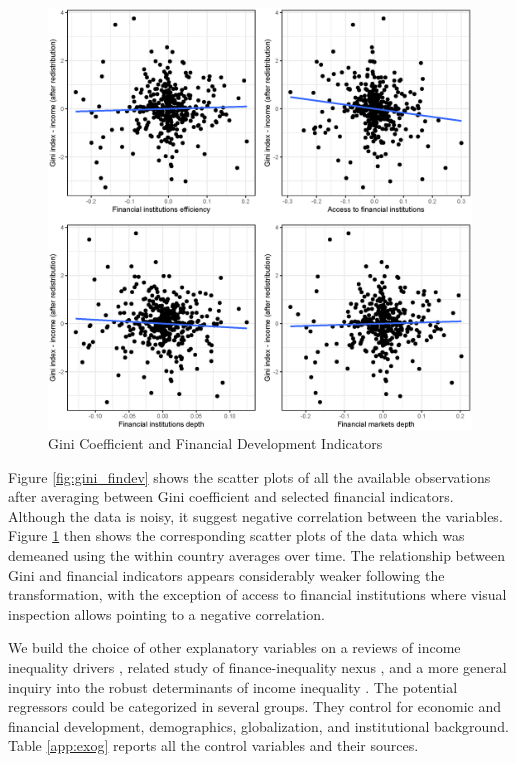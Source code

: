 \documentclass[a4paper,11pt]{article}
\begin{document}
\begin{figure}
    \caption{Gini Coefficient and Financial Development Indicators}
    \label{fig:gini_findev_dm}
    \includegraphics[width=\textwidth, keepaspectratio]{figures/plots_findev_gini_dm}
\end{figure}

Figure \ref{fig:gini_findev} shows the scatter plots of all the available observations after averaging between Gini coefficient and selected financial indicators. Although the data is noisy, it suggest negative correlation between the variables. Figure \ref{fig:gini_findev_dm} then shows the corresponding scatter plots of the data which was demeaned using the within country averages over time. The relationship between Gini and financial indicators appears considerably weaker following the transformation, with the exception of access to financial institutions where visual inspection allows pointing to a negative correlation.

 
We build the choice of other explanatory variables on a reviews of income inequality drivers \citep{roineetal2009,nolan2019drivers}, related study of finance-inequality nexus \citep{de2017finance}, and a more general inquiry into the robust determinants of income inequality \citep{furceri2019robust}. The potential regressors could be categorized in several groups. They control for economic and financial development, demographics, globalization, and institutional background. Table \ref{app:exog} reports all the control variables and their sources. 
\end{document}

